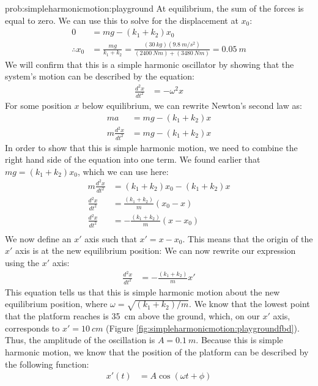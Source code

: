 \begin{solution}{prob:simpleharmonicmotion:playground}
At equilibrium, the sum of the forces is equal to zero. We can use this to solve for the displacement at $x_0$:
\begin{align*}
0&=mg-(k_1+k_2)x_0\\
\therefore x_0&=\frac{mg}{k_1+k_2}=\frac{(\SI{30}{kg})(\SI{9.8}{m/s^2})}{(\SI{2400}{Nm})+(\SI{3480}{Nm})}=\SI{0.05}{m}
\end{align*}
We will confirm that this is a simple harmonic oscillator by showing that the system's motion can be described by the equation:
\begin{align*}
\frac{d^2x}{dt^2}&=-\omega^2x
\end{align*}
For some position $x$ below equilibrium, we can rewrite Newton's second law as:
\begin{align*}
ma&=mg-(k_1+k_2)x\\
m\frac{d^2x}{dt^2}&=mg-(k_1+k_2)x
\end{align*}
In order to show that this is simple harmonic motion, we need to combine the right hand side of the equation into one term. We found earlier that $mg=(k_1+k_2)x_0$, which we can use here:
\begin{align*}
m\frac{d^2x}{dt^2}&=(k_1+k_2)x_0-(k_1+k_2)x\\
\frac{d^2x}{dt^2}&=\frac{(k_1+k_2)}{m}(x_0-x)\\
\frac{d^2x}{dt^2}&=-\frac{(k_1+k_2)}{m}(x-x_0)\\
\end{align*}
We now define an $x'$ axis such that $x'=x-x_0$. This means that the origin of the $x'$ axis is at the new equilibrium position:
We can now rewrite our expression using the $x'$ axis:
\begin{align*}
\frac{d^2x}{dt^2}&=-\frac{(k_1+k_2)}{m}x'
\end{align*}
This equation tells us that this is simple harmonic motion about the new equilibrium position, where $\omega=\sqrt{(k_1+k_2)/m}$. We know that the lowest point that the platform reaches is \SI{35}{cm} above the ground, which, on our $x'$ axis, corresponds to $x'=\SI{10}{cm}$ (Figure \ref{fig:simpleharmonicmotion:playgroundfbd}). Thus, the amplitude of the oscillation is $A=\SI{0.1}{m}$. Because this is simple harmonic motion, we know that the position of the platform can be described by the following function:
\begin{align*}
x'(t)&= A \cos(\omega t + \phi)

\end{align*}
\end{solution}
